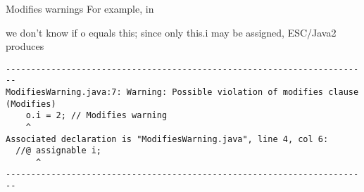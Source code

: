 \documentclass[
pdf,
nocolorBG,
slideColor,
cok,
]{prosper}
\begin{document}
\begin{slide}{Modifies warnings}
\vspace*{-9ex}
For example, in 
\begin{figure*}
\tiny

\end{figure*}
we don't know if {\blue o} equals {\blue this}; since only {\blue this.i} may be assigned,
 ESC/Java2 produces
\tiny
\begin{verbatim}
------------------------------------------------------------------------
ModifiesWarning.java:7: Warning: Possible violation of modifies clause (Modifies)
    o.i = 2; // Modifies warning
    ^
Associated declaration is "ModifiesWarning.java", line 4, col 6:
  //@ assignable i;
      ^
------------------------------------------------------------------------
\end{verbatim}

\end{slide}
\end{document}
